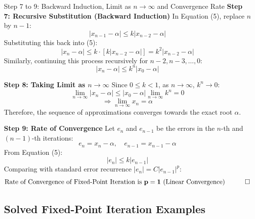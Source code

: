 \documentclass[11pt,a4paper]{article}
\begin{document}
\begin{exbox}{Step 7 to 9: Backward Induction, Limit as $n \to \infty$ and Convergence Rate}
\textbf{Step 7: Recursive Substitution (Backward Induction)}
In Equation (5), replace $n$ by $n-1$:
\begin{equation}
    |x_{n-1} - \alpha| \le k |x_{n-2} - \alpha|
\end{equation}
Substituting this back into (5):
\begin{equation}
    |x_n - \alpha| \le k \cdot \left[ k |x_{n-2} - \alpha| \right] = k^2 |x_{n-2} - \alpha|
\end{equation}
Similarly, continuing this process recursively for $n-2, n-3, \dots, 0$:
\begin{equation}
    |x_n - \alpha| \le k^n |x_0 - \alpha|
\end{equation}

\textbf{Step 8: Taking Limit as $n \to \infty$}
Since $0 \le k < 1$, as $n \to \infty$, $k^n \to 0$:
\begin{equation}
    \lim_{n \to \infty} |x_n - \alpha| \le |x_0 - \alpha| \lim_{n \to \infty} k^n = 0
\end{equation}
\begin{equation}
    \Rightarrow \lim_{n \to \infty} x_n = \alpha
\end{equation}
Therefore, the sequence of approximations converges towards the exact root $\alpha$.

\textbf{Step 9: Rate of Convergence}
Let $e_n$ and $e_{n-1}$ be the errors in the $n$-th and $(n-1)$-th iterations:
$$e_n = x_n - \alpha, \quad e_{n-1} = x_{n-1} - \alpha$$
From Equation (5):
\begin{equation}
    |e_n| \le k |e_{n-1}|
\end{equation}
Comparing with standard error recurrence $|e_n| = C |e_{n-1}|^p$:
$$\mathbf{\text{Rate of Convergence of Fixed-Point Iteration is } p = 1 \text{ (Linear Convergence)}} \quad \qed$$
\end{exbox}

\newpage

\subsection{Solved Fixed-Point Iteration Examples}
\end{document}
